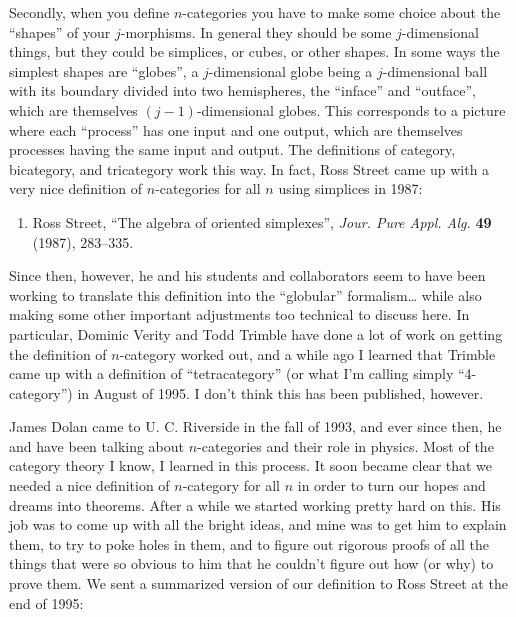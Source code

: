 \documentclass{article}
\def\tightlist{}
\begin{document}
Secondly, when you define \(n\)-categories you have to make some choice
about the ``shapes'' of your \(j\)-morphisms. In general they should be
some \(j\)-dimensional things, but they could be simplices, or cubes, or
other shapes. In some ways the simplest shapes are ``globes'', a
\(j\)-dimensional globe being a \(j\)-dimensional ball with its boundary
divided into two hemispheres, the ``inface'' and ``outface'', which are
themselves \((j-1)\)-dimensional globes. This corresponds to a picture
where each ``process'' has one input and one output, which are
themselves processes having the same input and output. The definitions
of category, bicategory, and tricategory work this way. In fact, Ross
Street came up with a very nice definition of \(n\)-categories for all
\(n\) using simplices in 1987:

\begin{enumerate}
\def\labelenumi{\arabic{enumi})}
\setcounter{enumi}{4}
\tightlist
\item
  Ross Street, ``The algebra of oriented simplexes'', \emph{Jour. Pure
  Appl. Alg.} \textbf{49} (1987), 283--335.
\end{enumerate}

Since then, however, he and his students and collaborators seem to have
been working to translate this definition into the ``globular''
formalism\ldots{} while also making some other important adjustments too
technical to discuss here. In particular, Dominic Verity and Todd
Trimble have done a lot of work on getting the definition of
\(n\)-category worked out, and a while ago I learned that Trimble came
up with a definition of ``tetracategory'' (or what I'm calling simply
``4-category'') in August of 1995. I don't think this has been
published, however.

James Dolan came to U. C. Riverside in the fall of 1993, and ever since
then, he and have been talking about \(n\)-categories and their role in
physics. Most of the category theory I know, I learned in this process.
It soon became clear that we needed a nice definition of \(n\)-category
for all \(n\) in order to turn our hopes and dreams into theorems. After
a while we started working pretty hard on this. His job was to come up
with all the bright ideas, and mine was to get him to explain them, to
try to poke holes in them, and to figure out rigorous proofs of all the
things that were so obvious to him that he couldn't figure out how (or
why) to prove them. We sent a summarized version of our definition to
Ross Street at the end of 1995:
\end{document}
